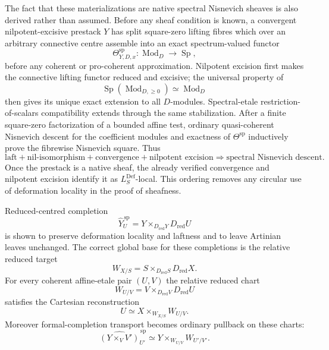 The fact that these materializations are native spectral Nisnevich sheaves is
also derived rather than assumed.  Before any sheaf condition is known, a
convergent nilpotent-excisive prestack $Y$ has split square-zero lifting fibres
which over an arbitrary connective centre assemble into
an exact spectrum-valued functor
\[
    \Theta^{\mathrm{sp}}_{Y,D,x}:
    \operatorname{Mod}_D
    \longrightarrow
    \operatorname{Sp},
\]
before any coherent or pro-coherent approximation.  Nilpotent excision first
makes the connective lifting functor reduced and excisive; the universal
property of
\[
    \operatorname{Sp}(\operatorname{Mod}_{D,\geq0})
    \simeq
    \operatorname{Mod}_D
\]
then gives its unique exact extension to all $D$-modules.  Spectral-etale
restriction-of-scalars compatibility extends through the same stabilization.
After a finite square-zero factorization of a bounded affine test, ordinary
quasi-coherent Nisnevich descent for the coefficient modules and exactness of
$\Theta^{\mathrm{sp}}$ inductively prove the fibrewise Nisnevich square.
Thus
\[
\boxed{
\text{laft}+\text{nil-isomorphism}+\text{convergence}+\text{nilpotent excision}
\Longrightarrow
\text{spectral Nisnevich descent}.}
\]
Once the prestack is a native sheaf, the already verified convergence and
nilpotent excision identify it as $L_S^{\mathrm{Def}}$-local.  This ordering
removes any circular use of deformation locality in the proof of sheafness.

Reduced-centred completion
\[
    \widehat Y^{\,\mathrm{sp}}_U
    =
    Y\times_{D_{\mathrm{red}}Y}D_{\mathrm{red}}U
\]
is shown to preserve deformation locality and laftness and to leave Artinian
leaves unchanged.  The correct global base for these completions is the
relative reduced target
\[
    W_{X/S}
    =
    S\times_{D_{\mathrm{red}}S}D_{\mathrm{red}}X.
\]
For every coherent affine-etale pair $(U,V)$ the relative reduced chart
\[
    W_{U/V}
    =
    V\times_{D_{\mathrm{red}}V}D_{\mathrm{red}}U
\]
satisfies the Cartesian reconstruction
\[
    U
    \simeq
    X\times_{W_{X/S}}W_{U/V}.
\]
Moreover formal-completion transport becomes ordinary pullback on these
charts:
\[
    \widehat{(Y\times_VV')}^{\,\mathrm{sp}}_{U'}
    \simeq
    Y\times_{W_{U/V}}W_{U'/V'}.
\]

